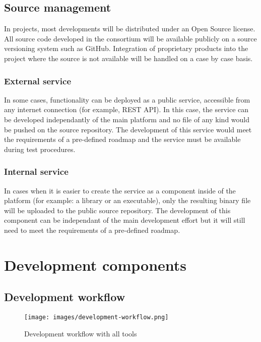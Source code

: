 \documentclass{learnpad}
\begin{document}
\section{Source management}
\label{sec:source-management2}

In \learnpad projects, most developments will be distributed under an Open Source license.
All source code developed in the consortium will be available publicly on a source versioning
system such as GitHub. Integration of proprietary products into the project where the source
is not available will be handled on a case by case basis.

\subsection{External service}
\label{sec:external-service}

In some cases, functionality can be deployed as a public service, accessible from any internet
connection (for example, REST API). In this case, the service can be developed independantly of
the main \learnpad platform and no file of any kind would be pushed on the source repository.
The development of this service would meet the requirements of a pre-defined roadmap and the
service must be available during test procedures.

\subsection{Internal service}
\label{sec:internal-service}

In cases when it is easier to create the service as a component inside of the \learnpad platform
(for example: a library or an executable), only the resulting binary file will be uploaded to the
public source repository. The development of this component can be independant of the main
development effort but it will still need to meet the requirements of a pre-defined roadmap.

\chapter{Development components}
\label{ch:development-components}

\section{Development workflow}
\label{sec:development-workflow}

\begin{figure}
\centering
\texttt{[image: images/development-workflow.png]}
\caption{Development workflow with all tools}
\label{fig:development-workflow}
\end{figure}
\end{document}
